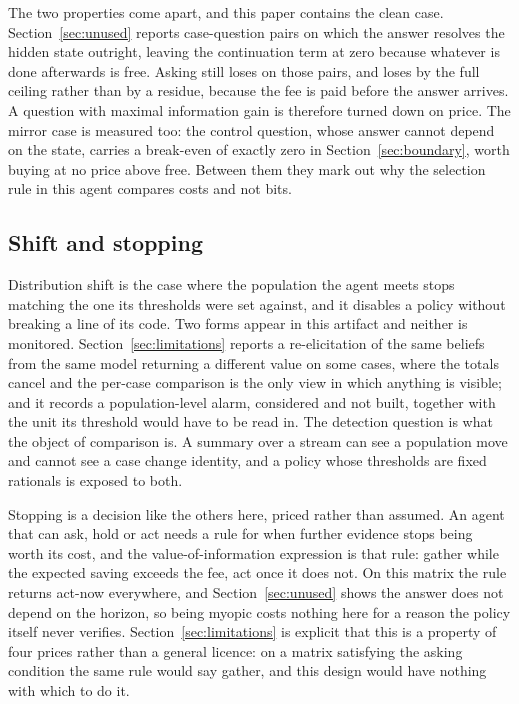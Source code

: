 \documentclass{article}
\begin{document}
The two properties come apart, and this paper contains the clean case.
Section~\ref{sec:unused} reports case-question pairs on which the answer resolves the
hidden state outright, leaving the continuation term at zero because whatever is done
afterwards is free. Asking still loses on those pairs, and loses by the full ceiling
rather than by a residue, because the fee is paid before the answer arrives. A question
with maximal information gain is therefore turned down on price. The mirror case is
measured too: the control question, whose answer cannot depend on the state, carries a
break-even of exactly zero in Section~\ref{sec:boundary}, worth buying at no price
above free. Between them they mark out why the selection rule in this agent compares
costs and not bits.

\subsection{Shift and stopping}

Distribution shift is the case where the population the agent meets stops matching the
one its thresholds were set against, and it disables a policy without breaking a line
of its code. Two forms appear in this artifact and neither is monitored.
Section~\ref{sec:limitations} reports a re-elicitation of the same beliefs from the
same model returning a different value on some cases, where the totals cancel and the
per-case comparison is the only view in which anything is visible; and it records a
population-level alarm, considered and not built, together with the unit its threshold
would have to be read in. The detection question is what the object of comparison is. A
summary over a stream can see a population move and cannot see a case change identity,
and a policy whose thresholds are fixed rationals is exposed to both.

Stopping is a decision like the others here, priced rather than assumed. An agent that
can ask, hold or act needs a rule for when further evidence stops being worth its cost,
and the value-of-information expression is that rule: gather while the expected saving
exceeds the fee, act once it does not. On this matrix the rule returns act-now
everywhere, and Section~\ref{sec:unused} shows the answer does not depend on the
horizon, so being myopic costs nothing here for a reason the policy itself never
verifies. Section~\ref{sec:limitations} is explicit that this is a property of four
prices rather than a general licence: on a matrix satisfying the asking condition the
same rule would say gather, and this design would have nothing with which to do it.
\end{document}
